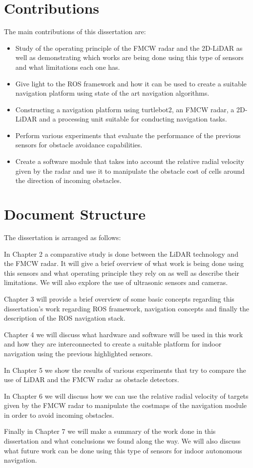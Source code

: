 \section{Contributions}
The main contributions of this dissertation are:
\begin{itemize}
    \item Study of the operating principle of the \ac{FMCW} \ac{radar} and the 2D-\ac{LiDAR} as well as demonstrating which works are being done using this type of sensors and what limitations each one has.
    \item Give light to the \ac{ROS} framework and how it can be used to create a suitable navigation platform using state of the art navigation algorithms.
    \item Constructing a navigation platform using turtlebot2, an \ac{FMCW} \ac{radar}, a 2D- \ac{LiDAR} and a processing unit suitable for conducting navigation tasks.
    \item Perform various experiments that evaluate the performance of the previous sensors for obstacle avoidance capabilities.
    \item Create a software module that takes into account the relative radial velocity given by the \ac{radar} and use it to manipulate the obstacle cost of cells around the direction of incoming obstacles.
\end{itemize}




\section{Document Structure}
The dissertation is arranged as follows:

In Chapter 2 a comparative study is done between the \ac{LiDAR} technology and the \ac{FMCW} \ac{radar}. It will give a brief overview of what work is being done using this sensors and what operating principle they rely on as well as describe their limitations. We will also explore the use of ultrasonic sensors and cameras.

Chapter 3 will provide a brief overview of some basic concepts regarding this dissertation's work regarding \ac{ROS} framework, navigation concepts and finally the description of the \ac{ROS} navigation stack.

Chapter 4 we will discuss what hardware and software will be used in this work and how they are interconnected to create a suitable platform for indoor navigation using the previous highlighted sensors.

In Chapter 5 we show the results of various experiments that try to compare the use of \ac{LiDAR} and the \ac{FMCW} \ac{radar} as obstacle detectors.

In Chapter 6 we will discuss how we can use the relative radial velocity of targets given by the \ac{FMCW} \ac{radar} to manipulate the costmaps of the navigation module in order to avoid incoming obstacles.

Finally in Chapter 7 we will make a summary of the work done in this dissertation and what conclusions we found along the way. We will also discuss what future work can be done using this type of sensors for indoor autonomous navigation.



